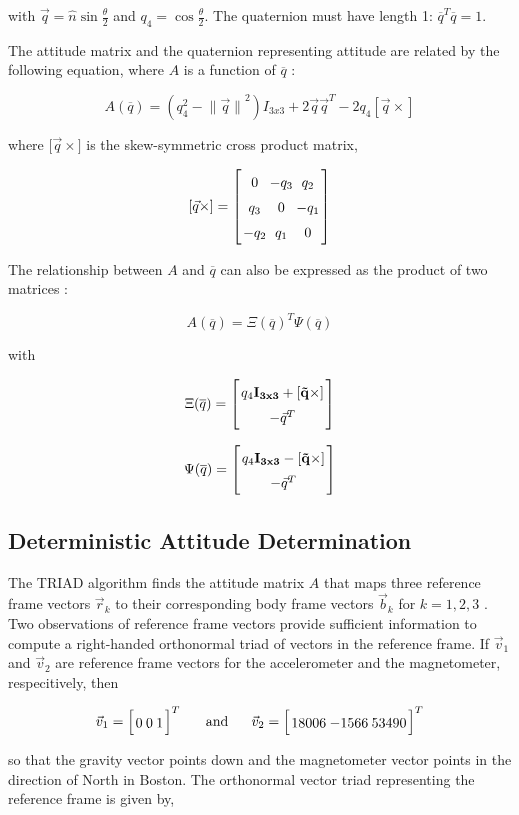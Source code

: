 \documentclass{article}
\newcommand{\mat}[2][ccccccccccccccccccccccccccccccccccccccccccccc]{\left[
        \arraycolsep=1.2pt\def\arraystretch{1.5}
        \begin{array}{#1} #2 \\ 
        \end{array} 
        \right]}
\newcommand{\tab}{\text{ \ \ \ \ }}
\begin{document}
\begin{flushleft}
with $\vec{q} = \hat{n} \sin{\frac{\theta}{2}}$ and $q_4 = \cos{\frac{\theta}{2}}$. The quaternion must have length 1: $\overline{q}^T \overline{q} = 1$. 

The attitude matrix and the quaternion representing attitude are related by the following equation, where $A$ is a function of $\overline{q}$ \cite{Shuster1982}: 

\[ A(\overline{q}) = (q_4^2 - {\| \vec{q} \|}^2) I_{3x3} + 2 \vec{q}\vec{q}^T - 2 q_4 [\vec{q}\times] \]

where ${[\vec{q}\times}]$ is the skew-symmetric cross product matrix, 

\[ [\vec{q}\times] = \mat{ 0 & -q_3 & q_2 \\ q_3 & 0 & -q_1 \\ -q_2 & q_1 & 0} \]

The relationship between $A$ and $\overline{q}$ can also be expressed as the product of two matrices \cite{Markley2007}: 

\[ A(\overline{q}) = \Xi(\overline{q})^{T} \Psi(\overline{q}) \]

with 

\[ \Xi(\overline{q}) = \mat{q_4 \bf{I}_{3x3} + [\vec{q}\times] \\ -\vec{q}^T } \]

\[ \Psi(\overline{q}) = \mat{q_4 \bf{I}_{3x3} - [\vec{q}\times] \\ -\vec{q}^T } \]

\subsection{Deterministic Attitude Determination}

The TRIAD algorithm finds the attitude matrix $A$ that maps three reference frame vectors $\vec{r}_k$ to their corresponding body frame vectors $\vec{b}_k$ for $k = 1, 2, 3$ \cite{Shuster2004}. Two observations of reference frame vectors provide sufficient information to compute a right-handed orthonormal triad of vectors in the reference frame. If $\vec{v}_1$ and $\vec{v}_2$ are reference frame vectors for the accelerometer and the magnetometer, respecitively, then 

$$ \vec{v}_1 = \mat{ 0 & 0 & 1 }^{T} \tab \text{and} \tab \vec{v}_2 = \mat{ 18006 & -1566 & 53490 }^{T} $$ 

so that the gravity vector points down and the magnetometer vector points in the direction of North in Boston. The orthonormal vector triad representing the reference frame is given by, 


\end{flushleft}
\end{document}
